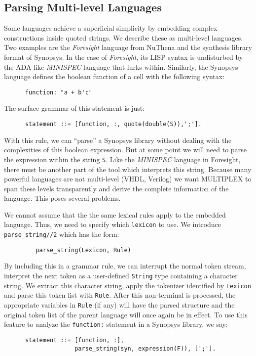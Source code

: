 \subsection{Parsing Multi-level Languages}

Some languages achieve a superficial simplicity by embedding
complex constructions inside quoted strings.
We describe these as multi-level languages.
Two examples are the {\it Foresight} language from NuThena
and the synthesis library format of Synopsys.
In the case of {\it Foresight}, its LISP syntax is undisturbed by
the ADA-like {\it MINISPEC} language that lurks within.
Similarly, the Synopsys language defines the
boolean function of a cell with the following syntax:
\begin{verbatim}
      function: "a + b'c"
\end{verbatim}
The surface grammar of this statement is just:
\begin{verbatim}
      statement ::= [function, :, quote(double(S)),';'].
\end{verbatim}
With this rule, we can ``parse'' a Synopsys library
without dealing with the complexities of this boolean expression.
But at some point we will need to parse the expression
within the string {\tt S}.
Like the {\it MINISPEC} language in Foresight, there must be another
part of the tool which interprets this string.
Because many powerful languages are not multi-level
(VHDL, Verilog) we want MULTIPLEX to span these levels
transparently and derive the complete information of the
language. This poses several problems.

We cannot assume that the the same lexical rules
apply to the embedded language. Thus, we need to specify
which {\tt lexicon} to use. We
introduce {\tt parse\_string//2} which has the form:
\begin{verbatim}
         parse_string(Lexicon, Rule)
\end{verbatim}
By including this in a grammar rule, we can interrupt
the normal token stream, interpret the next token as
a user-defined {\tt String} type containing a character
string. We extract this character string, apply the
tokenizer identified by {\tt Lexicon} and parse
this token list with {\tt Rule}.  After
this non-terminal is processed, the appropriate variables
in {\tt Rule} (if any) will have the parsed structure and
the original token list of the parent language will once
again be in effect. To use this feature to analyze the
{\tt function:} statement in a Synopsys library, we say:
\begin{verbatim}
      statement ::= [function, :],
                    parse_string(syn, expression(F)), [';'].
\end{verbatim}

